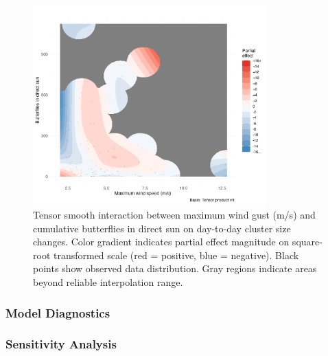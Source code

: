 \begin{figure}[htbp]
    \centering
    \includegraphics[width=0.8\textwidth]{supplemental/results/sunset/figures/interaction_wind_x_sun_binned.png}
    \caption{Tensor smooth interaction between maximum wind gust (m/s) and cumulative butterflies in direct sun on day-to-day cluster size changes. Color gradient indicates partial effect magnitude on square-root transformed scale (red = positive, blue = negative). Black points show observed data distribution. Gray regions indicate areas beyond reliable interpolation range.}
    \label{fig:interaction_wind_sun_sunset}
\end{figure}

\subsubsection{Model Diagnostics}

\subsubsection{Sensitivity Analysis}